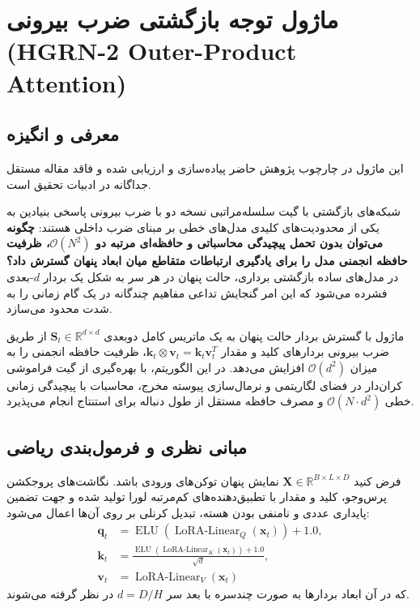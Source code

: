 \section{ماژول توجه بازگشتی ضرب بیرونی (HGRN-2 Outer-Product Attention)}
\label{sec:module_hgrn2_outer}

\subsection{معرفی و انگیزه}
این ماژول در چارچوب پژوهش حاضر پیاده‌سازی و ارزیابی شده و فاقد مقاله مستقل جداگانه در ادبیات تحقیق است.

شبکه‌های بازگشتی با گیت سلسله‌مراتبی نسخه دو با ضرب بیرونی  پاسخی بنیادین به یکی از محدودیت‌های کلیدی مدل‌های خطی بر مبنای ضرب داخلی هستند: \textbf{چگونه می‌توان بدون تحمل پیچیدگی محاسباتی و حافظه‌ای مرتبه دو $\mathcal{O}(N^2)$، ظرفیت حافظه انجمنی مدل را برای یادگیری ارتباطات متقاطع میان ابعاد پنهان گسترش داد؟} در مدل‌های ساده بازگشتی برداری، حالت پنهان در هر سر به شکل یک بردار $d$-بعدی فشرده می‌شود که این امر گنجایش تداعی مفاهیم چندگانه در یک گام زمانی را به شدت محدود می‌سازد.

ماژول  با گسترش بردار حالت پنهان به یک ماتریس کامل دوبعدی $\mathbf{S}_t \in \mathbb{R}^{d \times d}$ از طریق ضرب بیرونی بردارهای کلید و مقدار $\mathbf{k}_t \otimes \mathbf{v}_t = \mathbf{k}_t \mathbf{v}_t^T$، ظرفیت حافظه انجمنی را به میزان $\mathcal{O}(d^2)$ افزایش می‌دهد. در این الگوریتم، با بهره‌گیری از گیت فراموشی کران‌دار در فضای لگاریتمی و نرمال‌سازی پیوسته مخرج، محاسبات با پیچیدگی زمانی خطی $\mathcal{O}(N \cdot d^2)$ و مصرف حافظه مستقل از طول دنباله برای استنتاج انجام می‌پذیرد.

\subsection{مبانی نظری و فرمول‌بندی ریاضی}
فرض کنید $\mathbf{X} \in \mathbb{R}^{B \times L \times D}$ نمایش پنهان توکن‌های ورودی باشد. نگاشت‌های پروجکشن پرس‌وجو، کلید و مقدار با تطبیق‌دهنده‌های کم‌مرتبه لورا تولید شده و جهت تضمین پایداری عددی و نامنفی بودن هسته، تبدیل کرنلی بر روی آن‌ها اعمال می‌شود:
\begin{align}
\mathbf{q}_t &= \operatorname{ELU}(\operatorname{LoRA-Linear}_Q(\mathbf{x}_t)) + 1.0, \\
\mathbf{k}_t &= \frac{\operatorname{ELU}(\operatorname{LoRA-Linear}_K(\mathbf{x}_t)) + 1.0}{\sqrt{d}}, \\
\mathbf{v}_t &= \operatorname{LoRA-Linear}_V(\mathbf{x}_t)
\end{align}
که در آن ابعاد بردارها به صورت چندسره با بعد سر $d = D/H$ در نظر گرفته می‌شوند.

